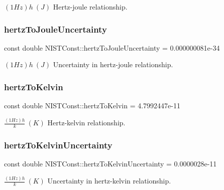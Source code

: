 $(1 Hz)h \ (J)$ Hertz-\/joule relationship. \mbox{\label{group___n_i_s_t_const-_hertz_ga6fde96f31fcfe10060d6996d0d5ff117}} 
\subsubsection{\texorpdfstring{hertz\+To\+Joule\+Uncertainty}{hertzToJouleUncertainty}}
{\footnotesize\ttfamily const double N\+I\+S\+T\+Const\+::hertz\+To\+Joule\+Uncertainty = 0.\+000000081e-\/34}

$(1 Hz)h \ (J)$ Uncertainty in hertz-\/joule relationship. \mbox{\label{group___n_i_s_t_const-_hertz_gacda137a5d10ebba59b340d770802678f}} 
\subsubsection{\texorpdfstring{hertz\+To\+Kelvin}{hertzToKelvin}}
{\footnotesize\ttfamily const double N\+I\+S\+T\+Const\+::hertz\+To\+Kelvin = 4.\+7992447e-\/11}

$\frac{(1 Hz)h}{k} \ (K)$ Hertz-\/kelvin relationship. \mbox{\label{group___n_i_s_t_const-_hertz_gacdec68d8c592492309f427551ae82a21}} 
\subsubsection{\texorpdfstring{hertz\+To\+Kelvin\+Uncertainty}{hertzToKelvinUncertainty}}
{\footnotesize\ttfamily const double N\+I\+S\+T\+Const\+::hertz\+To\+Kelvin\+Uncertainty = 0.\+0000028e-\/11}

$\frac{(1 Hz)h}{k} \ (K)$ Uncertainty in hertz-\/kelvin relationship. \mbox{\label{group___n_i_s_t_const-_hertz_ga7b63758ab74cb80c236d4eacd5b89484}} 
